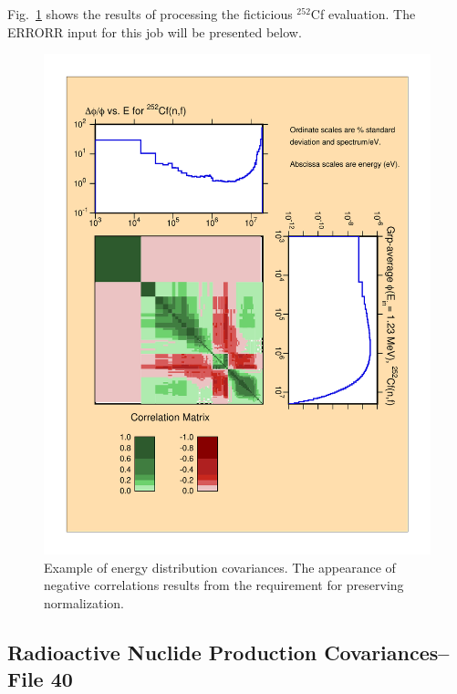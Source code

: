 Fig.~\ref{mf35cov}
shows the results of processing the ficticious $^{252}$Cf evaluation.  The
ERRORR input for this job will be presented below.

\begin{figure}[thb]\centering
\includegraphics[keepaspectratio, width=5in, angle=0]{figs/mf35covack}
\caption[$^{252}$Cf(n,f) spontaneous fission spectrum covariance data]{Example
 of energy distribution covariances.  The appearance of negative correlations
 results from the requirement for preserving normalization.}
\label{mf35cov}
\end{figure}

\subsection{Radioactive Nuclide Production Covariances--File 40}
\label{ssERRORR_40}

